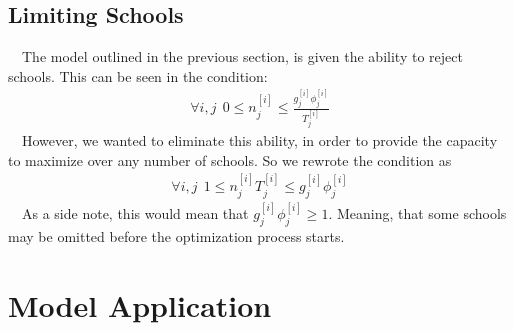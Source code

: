 \documentclass[12pt]{scrartcl}
\begin{document}
	\subsection{Limiting Schools}
		\ \ The model outlined in the previous section, is given the ability to reject schools. This can be seen in the condition:
		\begin{align*}
			\forall i,j \ \ 0\le n_j^{[i]} \le \frac{g_j^{[i]}\phi_j^{[i]}}{T_j^{[i]}}
		\end{align*}
		\ \ However, we wanted to eliminate this ability, in order to provide the capacity to maximize over any number of schools. So we rewrote the condition as 
		\begin{align}
			\forall i,j \ \ 1\le n_j^{[i]}T_j^{[i]} \le g_j^{[i]}\phi_j^{[i]}
		\end{align}	
		\ \ As a side note, this would mean that $g_j^{[i]}\phi_j^{[i]}\ge1$. Meaning, that some schools may be omitted before the optimization process starts.
\section{Model Application} 
\end{document}
